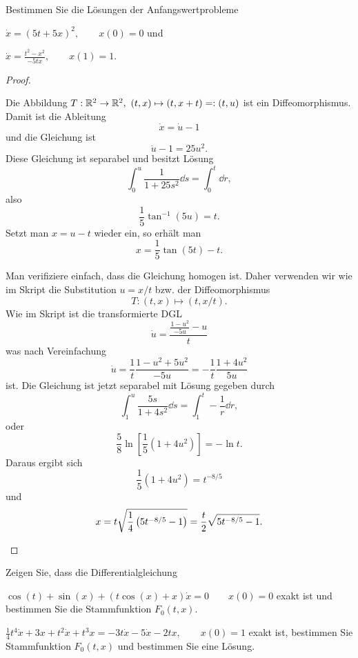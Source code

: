 \begin{Problem}
Bestimmen Sie die Lösungen der Anfangswertprobleme
\begin{parts}
	\item $\dot{x}=(5t+5x)^2,\qquad x(0)=0$ und
	\item $\dot{x}=\frac{t^2-x^2}{-5tx},\qquad x(1)=1$.
\end{parts}
\end{Problem}
\begin{proof}
	\begin{parts}
	\item Die Abbildung $T:\mathbb{R}^2\to \mathbb{R}^2,~(t,x)\mapsto (t, x+t)=:(t, u)$ ist ein Diffeomorphismus. Damit ist die Ableitung
	\[
		\dot{x}=\dot{u}-1
	\]
	und die Gleichung ist
	\[
		\dot{u}-1=25u^2
	.\]
	Diese Gleichung ist separabel und besitzt L\"{o}sung
	\[
	\int_0^u \frac{1}{1+25s^2}\dd{s}=\int_0^t \dd{r}
	,\]
	also
	\[
		\frac{1}{5}\tan^{-1}(5u)=t
	.\] 
	Setzt man $x=u-t$ wieder ein, so erhält man
	\[
	x=\frac{1}{5}\tan (5t)-t
	.\] 
\item Man verifiziere einfach, dass die Gleichung homogen ist. Daher verwenden wir wie im Skript die Substitution $u=x / t$ bzw. der Diffeomorphismus
	\[
	T:(t,x)\mapsto (t, x / t)
	.\] 
Wie im Skript ist die transformierte DGL
\[
	\dot{u}=\frac{\frac{1-u^2}{-5u}-u}{t}
\] 
was nach Vereinfachung
\[
	\dot{u}=\frac{1}{t}\frac{1-u^2+5u^2}{-5u}=-\frac{1}{t}\frac{1+4u^2}{5u}
\] 
ist. Die Gleichung ist jetzt separabel mit L\"{o}sung gegeben durch
\[
	\int_1^u \frac{5s}{1+4s^2}\dd{s}=\int_1^t -\frac{1}{r}\dd{r}
,\] 
oder
\[
\frac{5}{8}\ln \left[ \frac{1}{5}\left( 1+4u^2 \right)  \right]=-\ln t 
.\] 
Daraus ergibt sich
\[
	\frac{1}{5}(1+4u^2)=t^{-8 / 5}
\] 
und
\[
	x=t\sqrt{\frac{1}{4}\left( 5t^{-8 / 5}-1 \right) }=\frac{t}{2}\sqrt{5t^{-8 / 5}-1}  
.\qedhere\] 
	\end{parts}
\end{proof}
\begin{Problem}
	Zeigen Sie, dass die Differentialgleichung
	\begin{parts}
	\item $\cos(t)+\sin(x)+(t\cos(x)+x)\dot{x}=0\qquad x(0)=0$ exakt ist und bestimmen Sie die Stammfunktion $F_0(t,x)$.
	\item $\frac{1}{4}t^4 \dot{x}+3x+t^2\dot{x}+t^3x=-3t\dot{x}-5\dot{x}-2tx,\qquad x(0)=1$ exakt ist, bestimmen Sie Stammfunktion $F_0(t, x)$ und bestimmen Sie eine Lösung.
	\end{parts}
\end{Problem}
